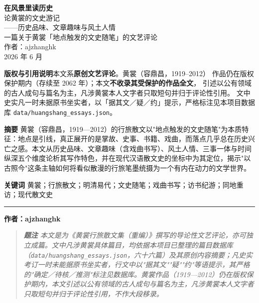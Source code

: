 \documentclass[UTF8,fontset=none,zihao=-4,a4paper]{ctexart}
\newcommand{\kai}{\CJKfamily{zhkai}}
\begin{document}
\sloppy



\begin{titlepage}
\centering
\vspace*{3.2cm}
{\sffamily\bfseries\fontsize{28}{34}\selectfont 在风景里读历史}\\[10pt]
{\kai\Large 论黄裳的文史游记}\\[2.6cm]
{\large ——历史品味、文章趣味与风土人情}\\[0.6cm]
{\large 一篇关于黄裳「地点触发的文史随笔」的文艺评论}\\[3cm]
{\large 作者：ajzhanghk}\\[0.4cm]
{\normalsize 2026 年 6 月}\\
\vfill
\begin{tcolorbox}[colback=gray!6,colframe=gray!55,boxrule=0.6pt,
  arc=2pt,left=10pt,right=10pt,top=8pt,bottom=8pt,width=0.92\linewidth]
\small
\textbf{版权与引用说明}\quad 本文系\textbf{原创文艺评论}。黄裳（容鼎昌，1919--2012）
作品仍在版权保护期内（存续至 2062 年）；本文\textbf{不收录其受保护的作品全文}，
引述以公有领域的古人成句与篇名为主，凡涉黄裳本人文字者只取短句并归于评论性引用。
文中史实凡一时未据原书坐实者，以「据其文／疑／约」提示，严格标注见本项目数据库
\texttt{data/huangshang\_essays.json}。
\end{tcolorbox}
\end{titlepage}


\tableofcontents

\clearpage


\textbf{摘要} 黄裳（容鼎昌，1919—2012）的行旅散文以"地点触发的文史随笔"为本质特征：地点是引线，真正展开的是掌故、史事、书籍、戏曲，而落点几乎总在历史兴亡之感。本文从历史品味、文章趣味（含戏曲书写）、风土人情、三事一体与时间纵深五个维度论析其写作特色，并在现代汉语散文史的坐标中为其定位，揭示"以古照今"这条主轴如何将看似散漫的行旅笔墨统摄为一个有内在动力的文学世界。


\textbf{关键词} 黄裳；行旅散文；明清易代；文史随笔；戏曲书写；访书纪游；同地重访；现代散文史


\medskip\hrule\medskip

\textbf{作者：ajzhanghk}


\begin{quote}\small\itshape
\textbf{题注} 本文是为《黄裳行旅散文集（重编）》撰写的导论性文艺评论，亦可独立成篇。文中凡涉黄裳具体篇目，均依据本项目已整理的篇目数据库（\texttt{data/huangshang\_essays.json}，六十六篇）及其原创内容摘要；凡史实考订一时未能据原书坐实者，行文中以"据其文""疑""约"等语提示，其严格的"确定／待核／推测"标注见数据库。黄裳作品（1919—2012）仍在版权保护期内，本文引述以公有领域的古人成句与篇名为主，凡涉黄裳本人文字者只取短句并归于评论性引用，不作大段移录。
\end{quote}
\end{document}
